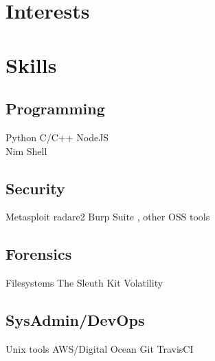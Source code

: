 \documentclass[]{resume-openfont}
\begin{document}
\begin{minipage}[t]{0.33\textwidth}
\vspace{6mm} %

\section{Interests}
\sectionsep


\vspace{6mm} %

\section{Skills}
\subsection{Programming}
Python \textbullet{} C/C++ \textbullet{} NodeJS \\ \textbullet{} Nim \textbullet{} Shell
\sectionsep
\subsection{Security}
Metasploit \textbullet{} radare2 \textbullet{} Burp Suite \textbullet{}, other OSS tools 
\sectionsep
\subsection{Forensics}
Filesystems \textbullet{} The Sleuth Kit \textbullet{} Volatility
\sectionsep
\subsection{SysAdmin/DevOps}
Unix tools \textbullet{} AWS/Digital Ocean \textbullet{} Git \textbullet{} TravisCI
%
%

\end{minipage} 
\hfill
\end{document}
